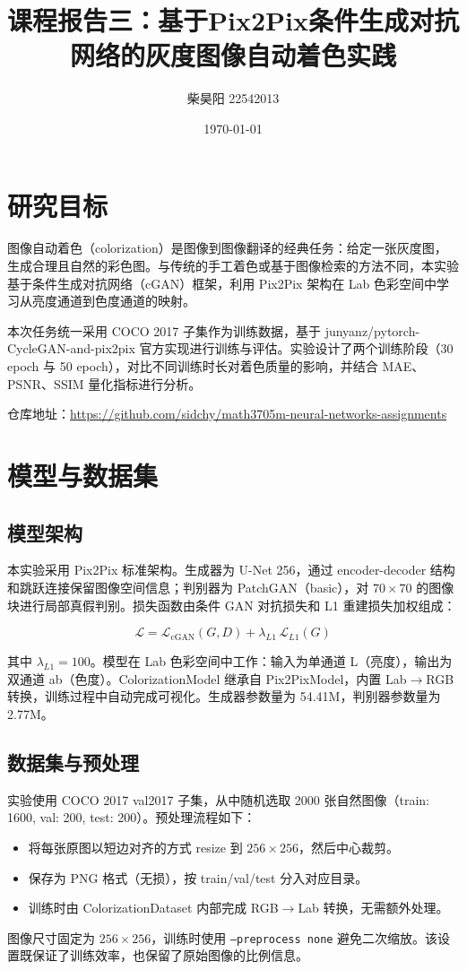 \documentclass[UTF8,a4paper,twocolumn]{ctexart}
\title{课程报告三：基于Pix2Pix条件生成对抗网络的灰度图像自动着色实践}
\author{柴昊阳 22542013}
\date{\today}
\begin{document}
\maketitle
\small

\section{研究目标}

图像自动着色（colorization）是图像到图像翻译的经典任务：给定一张灰度图，生成合理且自然的彩色图。与传统的手工着色或基于图像检索的方法不同，本实验基于条件生成对抗网络（cGAN）框架，利用 Pix2Pix 架构在 Lab 色彩空间中学习从亮度通道到色度通道的映射。

本次任务统一采用 COCO 2017 子集作为训练数据，基于 junyanz/pytorch-CycleGAN-and-pix2pix 官方实现进行训练与评估。实验设计了两个训练阶段（30 epoch 与 50 epoch），对比不同训练时长对着色质量的影响，并结合 MAE、PSNR、SSIM 量化指标进行分析。

仓库地址：\url{https://github.com/sidchy/math3705m-neural-networks-assignments}

\section{模型与数据集}

\subsection{模型架构}

本实验采用 Pix2Pix 标准架构。生成器为 U-Net 256，通过 encoder-decoder 结构和跳跃连接保留图像空间信息；判别器为 PatchGAN（basic），对 $70\times70$ 的图像块进行局部真假判别。损失函数由条件 GAN 对抗损失和 L1 重建损失加权组成：

\[
\mathcal{L} = \mathcal{L}_{\text{cGAN}}(G, D) + \lambda_{L1} \, \mathcal{L}_{L1}(G)
\]

其中 $\lambda_{L1} = 100$。模型在 Lab 色彩空间中工作：输入为单通道 L（亮度），输出为双通道 ab（色度）。ColorizationModel 继承自 Pix2PixModel，内置 Lab$\rightarrow$RGB 转换，训练过程中自动完成可视化。生成器参数量为 54.41M，判别器参数量为 2.77M。

\subsection{数据集与预处理}

实验使用 COCO 2017 val2017 子集，从中随机选取 2000 张自然图像（train: 1600, val: 200, test: 200）。预处理流程如下：
\begin{itemize}
\item 将每张原图以短边对齐的方式 resize 到 $256\times256$，然后中心裁剪。
\item 保存为 PNG 格式（无损），按 train/val/test 分入对应目录。
\item 训练时由 ColorizationDataset 内部完成 RGB$\rightarrow$Lab 转换，无需额外处理。
\end{itemize}
图像尺寸固定为 $256\times256$，训练时使用 \texttt{--preprocess none} 避免二次缩放。该设置既保证了训练效率，也保留了原始图像的比例信息。
\end{document}
